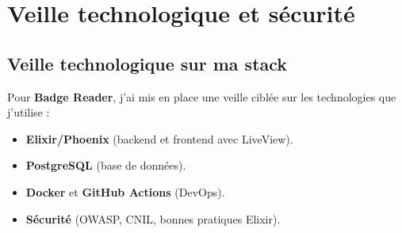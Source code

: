\chapter{Veille technologique et sécurité}

\section{Veille technologique sur ma stack}
Pour \textbf{Badge Reader}, j’ai mis en place une veille ciblée sur les technologies que j’utilise :
\begin{itemize}
    \item \textbf{Elixir/Phoenix} (backend et frontend avec LiveView).
    \item \textbf{PostgreSQL} (base de données).
    \item \textbf{Docker} et \textbf{GitHub Actions} (DevOps).
    \item \textbf{Sécurité} (OWASP, CNIL, bonnes pratiques Elixir).
\end{itemize}

\text{\newline}


